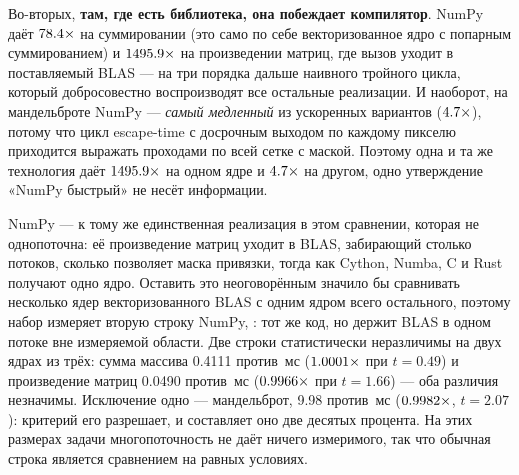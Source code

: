 Во-вторых, \textbf{там, где есть библиотека, она побеждает компилятор}. NumPy даёт $\meas{ratio:b1_compute-314:arraysum/cpython_loop|b1_compute-314:arraysum/numpy}{78.4}\times$ на
суммировании (это само по себе векторизованное ядро с попарным суммированием) и $\meas{ratio:b1_compute-314:matmul/cpython_loop|b1_compute-314:matmul/numpy}{1495.9}\times$ на
произведении матриц, где вызов уходит в поставляемый BLAS --- на три порядка дальше наивного
тройного цикла, который добросовестно воспроизводят все остальные реализации. И наоборот, на
мандельброте NumPy --- \emph{самый медленный} из ускоренных вариантов ($\meas{ratio:b1_compute-314:mandelbrot/cpython_loop|b1_compute-314:mandelbrot/numpy}{4.7}\times$), потому что
цикл escape-time с досрочным выходом по каждому пикселю приходится выражать проходами по всей
сетке с маской. Поэтому одна и та же технология даёт $\meas{ratio:b1_compute-314:matmul/cpython_loop|b1_compute-314:matmul/numpy}{1495.9}\times$ на одном ядре и
$\meas{ratio:b1_compute-314:mandelbrot/cpython_loop|b1_compute-314:mandelbrot/numpy}{4.7}\times$ на другом, одно утверждение «NumPy быстрый» не несёт информации.

NumPy --- к тому же единственная реализация в этом сравнении, которая не однопоточна: её
произведение матриц уходит в BLAS, забирающий столько потоков, сколько позволяет маска
привязки, тогда как Cython, Numba, C и Rust получают одно ядро. Оставить это неоговорённым значило
бы сравнивать несколько ядер векторизованного BLAS с одним ядром всего остального, поэтому набор
измеряет вторую строку NumPy, : тот же код, но  держит BLAS в
одном потоке вне измеряемой области. Две строки статистически неразличимы на двух ядрах из трёх:
сумма массива 0.4111 против \,мс ($\meas{ratio:b1_compute-314:arraysum/numpy_1t|b1_compute-314:arraysum/numpy}{1.0001}\times$ при $t=0.49$) и произведение матриц
0.0490 против \,мс ($\meas{ratio:b1_compute-314:matmul/numpy_1t|b1_compute-314:matmul/numpy}{0.9966}\times$ при $t=1.66$) --- оба различия незначимы. Исключение
одно --- мандельброт, 9.98 против \,мс ($\meas{ratio:b1_compute-314:mandelbrot/numpy_1t|b1_compute-314:mandelbrot/numpy}{0.9982}\times$, $t=2.07$): критерий его разрешает, и
составляет оно две десятых процента. На этих размерах задачи многопоточность не даёт ничего
измеримого, так что обычная строка  является сравнением на равных условиях.

